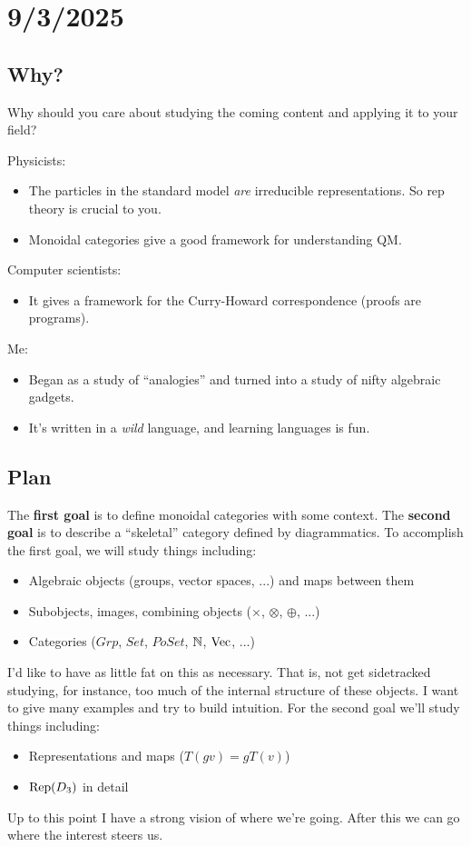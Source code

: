 \section*{9/3/2025}

\subsection*{Why?}
Why should you care about studying the coming content and applying it to your field?

Physicists:
\begin{itemize}
    \item The particles in the standard model {\it are} irreducible representations. 
    So rep theory is crucial to you.
    \item Monoidal categories give a good framework for understanding QM.
\end{itemize}
Computer scientists:
\begin{itemize}
    \item It gives a framework for the Curry-Howard correspondence (proofs are programs).
\end{itemize}
Me:
\begin{itemize}
    \item Began as a study of ``analogies'' and turned into a study of nifty algebraic gadgets.
    \item It's written in a {\it wild} language, and learning languages is fun.
\end{itemize}


\subsection*{Plan}
The {\bf first goal} is to define monoidal categories with some context. 
The {\bf second goal} is to describe a ``skeletal'' category defined by diagrammatics.
To accomplish the first goal, we will study things including:
\begin{itemize}
    \item Algebraic objects (groups, vector spaces, ...) and maps between them 
    \item Subobjects, images, combining objects ($\times$, $\otimes$, $\oplus$, ...) 
    \item Categories ($Grp$, $Set$, $PoSet$, $\mathbb{N}$, $\operatorname{Vec}$, ...)
\end{itemize}
I'd like to have as little fat on this as necessary.
That is, not get sidetracked studying, for instance, too much of the internal structure of these objects.
I want to give many examples and try to build intuition.
For the second goal we'll study things including:
\begin{itemize}
    \item Representations and maps ($T(gv) = gT(v)$)
    \item $\operatorname{Rep}(D_3)$ in detail
\end{itemize}
Up to this point I have a strong vision of where we're going. 
After this we can go where the interest steers us.

